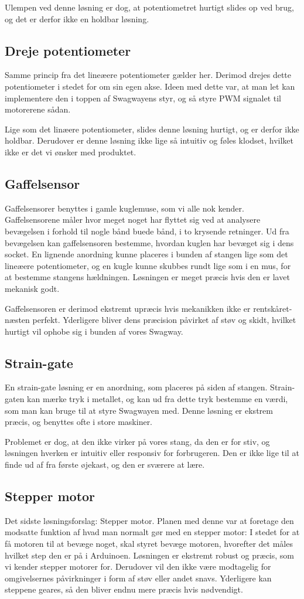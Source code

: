 \documentclass[a4paper,oneside,article,danish,table]{memoir}
\begin{document}
Ulempen ved denne løsning er dog, at potentiometret hurtigt slides op ved brug, og det er derfor ikke en holdbar løsning. 
\subsection{Dreje potentiometer}
Samme princip fra det lineæere potentiometer gælder her. Derimod drejes dette potentiometer i stedet for om sin egen akse. Ideen med dette var, at man let kan implementere den i toppen af Swagwayens styr, og så styre PWM signalet til motorerene sådan. 

Lige som det linæere potentiometer, slides denne løsning hurtigt, og er derfor ikke holdbar. Derudover er denne løsning ikke lige så intuitiv og føles klodset, hvilket ikke er det vi ønsker med produktet.
\subsection{Gaffelsensor}
Gaffelsensorer benyttes i gamle kuglemuse, som vi alle nok kender. Gaffelsensorene måler hvor meget noget har flyttet sig ved at analysere bevægelsen i forhold til nogle bånd buede bånd, i to krysende retninger. Ud fra bevægelsen kan gaffelsensoren bestemme, hvordan kuglen har bevæget sig i dens socket. En lignende anordning kunne placeres i bunden af stangen lige som det lineæere potentiometer, og en kugle kunne skubbes rundt lige som i en mus, for at bestemme stangens hældningen. Løsningen er meget præcis hvis den er lavet mekanisk godt.

Gaffelsensoren er derimod ekstremt upræcis hvis mekanikken ikke er rentskåret-næsten perfekt. Yderligere bliver dens præcision påvirket af støv og skidt, hvilket hurtigt vil ophobe sig i bunden af vores Swagway.
\subsection{Strain-gate}
En strain-gate løsning er en anordning, som placeres på siden af stangen. Strain-gaten kan mærke tryk i metallet, og kan ud fra dette tryk bestemme en værdi, som man kan bruge til at styre Swagwayen med. Denne løsning er ekstrem præcis, og benyttes ofte i store maskiner.

Problemet er dog, at den ikke virker på vores stang, da den er for stiv, og løsningen hverken er intuitiv eller responsiv for forbrugeren. Den er ikke lige til at finde ud af fra første øjekast, og den er sværere at lære.
\subsection{Stepper motor}
Det sidste løsningsforslag: Stepper motor. Planen med denne var at foretage den modsatte funktion af hvad man normalt gør med en stepper motor: I stedet for at få motoren til at bevæge noget, skal styret bevæge motoren, hvorefter det måles hvilket step den er på i Arduinoen. Løsningen er ekstremt robust og præcis, som vi kender stepper motorer for. Derudover vil den ikke være modtagelig for omgivelsernes påvirkninger i form af støv eller andet snavs. Yderligere kan steppene geares, så den bliver endnu mere præcis hvis nødvendigt.
\end{document}
